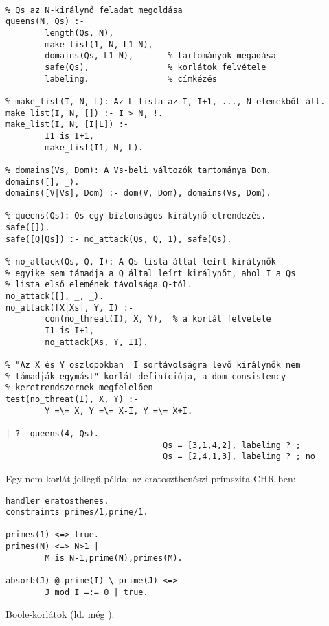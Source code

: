 \begin{verbatim}

% Qs az N-királynő feladat megoldása
queens(N, Qs) :-
        length(Qs, N), 
        make_list(1, N, L1_N), 
        domains(Qs, L1_N),       % tartományok megadása
        safe(Qs),                % korlátok felvétele
        labeling.                % címkézés

% make_list(I, N, L): Az L lista az I, I+1, ..., N elemekből áll.
make_list(I, N, []) :- I > N, !.
make_list(I, N, [I|L]) :-
        I1 is I+1,
        make_list(I1, N, L).

% domains(Vs, Dom): A Vs-beli változók tartománya Dom.
domains([], _).
domains([V|Vs], Dom) :- dom(V, Dom), domains(Vs, Dom).

% queens(Qs): Qs egy biztonságos királynő-elrendezés.
safe([]).
safe([Q|Qs]) :- no_attack(Qs, Q, 1), safe(Qs).

% no_attack(Qs, Q, I): A Qs lista által leírt királynők
% egyike sem támadja a Q által leírt királynőt, ahol I a Qs
% lista első elemének távolsága Q-tól.
no_attack([], _, _).
no_attack([X|Xs], Y, I) :-
        con(no_threat(I), X, Y),  % a korlát felvétele
        I1 is I+1, 
        no_attack(Xs, Y, I1).

% "Az X és Y oszlopokban  I sortávolságra levő királynők nem 
% támadják egymást" korlát definíciója, a dom_consistency 
% keretrendszernek megfelelően
test(no_threat(I), X, Y) :-
        Y =\= X, Y =\= X-I, Y =\= X+I.

| ?- queens(4, Qs).
                                Qs = [3,1,4,2], labeling ? ;
                                Qs = [2,4,1,3], labeling ? ; no
\end{verbatim}

Egy nem korlát-jellegű példa: az eratoszthenészi prímszita CHR-ben:

\begin{verbatim}
handler eratosthenes.
constraints primes/1,prime/1.

primes(1) <=> true.
primes(N) <=> N>1 | 
        M is N-1,prime(N),primes(M). 

absorb(J) @ prime(I) \ prime(J) <=> 
        J mod I =:= 0 | true.
\end{verbatim}

Boole-korlátok (ld. még ):

